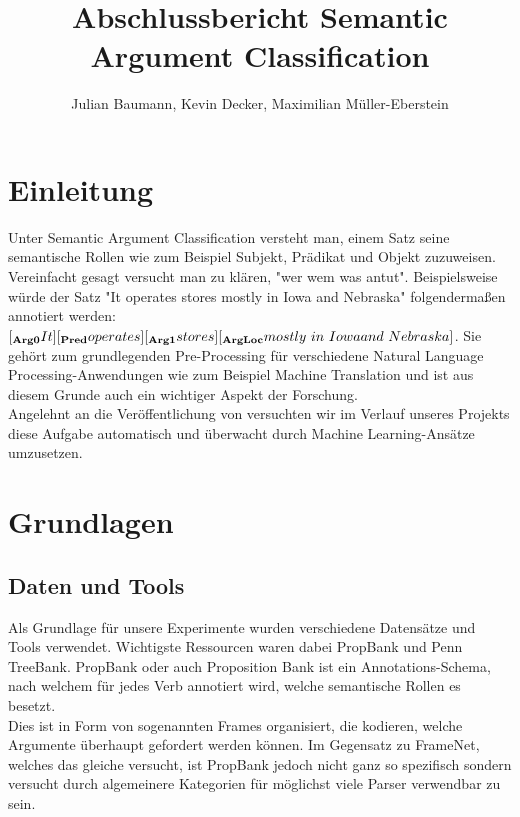 \documentclass[]{article}
\title{Abschlussbericht Semantic Argument Classification}
\author{Julian Baumann, Kevin Decker, Maximilian Müller-Eberstein}
\begin{document}
\maketitle

\section{Einleitung}
Unter Semantic Argument Classification versteht man, einem Satz seine semantische Rollen wie zum Beispiel Subjekt, Prädikat und Objekt zuzuweisen. Vereinfacht gesagt versucht man zu klären, "wer wem was antut". Beispielsweise würde der Satz "It operates stores mostly in Iowa and Nebraska" folgendermaßen annotiert werden: $ [_{\textbf{Arg0}} It][_{\textbf{Pred}} operates][_{\textbf{Arg1}} stores][_{\textbf{ArgLoc}} mostly\ in\ Iowa\\ and\ Nebraska] $. Sie gehört zum grundlegenden Pre-Processing für verschiedene Natural Language Processing-Anwendungen wie zum Beispiel Machine Translation und ist aus diesem Grunde auch ein wichtiger Aspekt der Forschung. \\
Angelehnt an die Veröffentlichung von \cite{Pradhan05supportvector} versuchten wir im Verlauf unseres Projekts diese Aufgabe automatisch und überwacht durch Machine Learning-Ansätze umzusetzen. 

\section{Grundlagen}
\subsection{Daten und Tools}
Als Grundlage für unsere Experimente wurden verschiedene Datensätze und Tools verwendet. Wichtigste Ressourcen waren dabei PropBank und Penn TreeBank. PropBank \cite{Palmer:2005:PBA:1122624.1122628} oder auch Proposition Bank ist ein Annotations-Schema, nach welchem für jedes  Verb annotiert wird, welche semantische Rollen es besetzt. \\ Dies ist in Form von sogenannten Frames organisiert, die kodieren, welche Argumente überhaupt gefordert werden können. Im Gegensatz zu FrameNet, welches das gleiche versucht, ist PropBank jedoch nicht ganz so spezifisch sondern versucht durch algemeinere Kategorien für möglichst viele Parser verwendbar zu sein.\\ 
\end{document}
